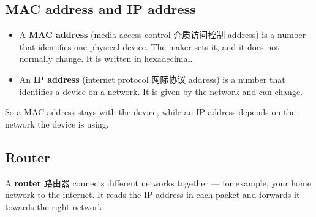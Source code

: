 \documentclass[11pt]{article}
\begin{document}
\subsection*{MAC address and IP address}

\begin{itemize}
\item A \textbf{MAC address} (media access control 介质访问控制 address) is a number that identifies one physical device. The maker sets it, and it does not normally change. It is written in hexadecimal.

\item An \textbf{IP address} (internet protocol 网际协议 address) is a number that identifies a device on a network. It is given by the network and can change.

\end{itemize}

So a MAC address stays with the device, while an IP address depends on the network the device is using.

\subsection*{Router}

A \textbf{router} 路由器 connects different networks together — for example, your home network to the internet. It reads the IP address in each packet and forwards it towards the right network.
\end{document}

